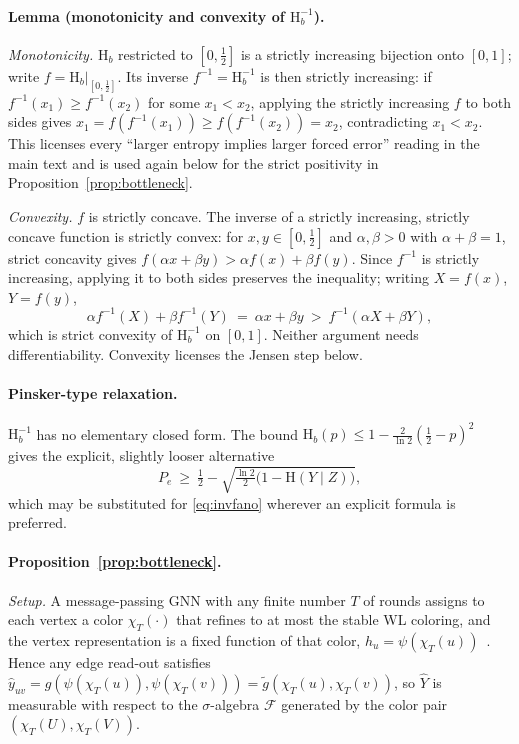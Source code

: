 \documentclass[sigconf, review, anonymous]{acmart}
\newcommand{\Hh}{\mathrm{H}}
\theoremstyle{plain}
\theoremstyle{definition}
\begin{document}
\paragraph{Lemma (monotonicity and convexity of $\Hh_b^{-1}$).}
\emph{Monotonicity.} $\Hh_b$ restricted to $[0,\tfrac12]$ is a strictly increasing bijection onto $[0,1]$; write $f=\Hh_b|_{[0,\tfrac12]}$. Its inverse $f^{-1}=\Hh_b^{-1}$ is then strictly increasing: if $f^{-1}(x_1)\ge f^{-1}(x_2)$ for some $x_1<x_2$, applying the strictly increasing $f$ to both sides gives $x_1=f(f^{-1}(x_1))\ge f(f^{-1}(x_2))=x_2$, contradicting $x_1<x_2$. This licenses every ``larger entropy implies larger forced error'' reading in the main text and is used again below for the strict positivity in Proposition~\ref{prop:bottleneck}.

\emph{Convexity.} $f$ is strictly concave. The inverse of a strictly increasing, strictly concave function is strictly convex: for $x,y\in[0,\tfrac12]$ and $\alpha,\beta>0$ with $\alpha+\beta=1$, strict concavity gives $f(\alpha x+\beta y) > \alpha f(x)+\beta f(y)$. Since $f^{-1}$ is strictly increasing, applying it to both sides preserves the inequality; writing $X=f(x)$, $Y=f(y)$,
\[
\alpha f^{-1}(X)+\beta f^{-1}(Y) \ =\ \alpha x+\beta y \ >\ f^{-1}(\alpha X+\beta Y),
\]
which is strict convexity of $\Hh_b^{-1}$ on $[0,1]$. Neither argument needs differentiability. Convexity licenses the Jensen step below.

\paragraph{Pinsker-type relaxation.} $\Hh_b^{-1}$ has no elementary closed form. The bound $\Hh_b(p)\le 1-\tfrac{2}{\ln 2}(\tfrac12-p)^2$~\citep{yeung2008information} gives the explicit, slightly looser alternative
\begin{equation}
P_e\ \ge\ \tfrac12-\sqrt{\tfrac{\ln 2}{2}\big(1-\Hh(Y\mid Z)\big)},
\label{eq:pinsker}
\end{equation}
which may be substituted for \eqref{eq:invfano} wherever an explicit formula is preferred.

\paragraph{Proposition~\ref{prop:bottleneck}.}
\emph{Setup.} A message-passing GNN with any finite number $T$ of rounds assigns to each vertex a color $\chi_T(\cdot)$ that refines to at most the stable WL coloring, and the vertex representation is a fixed function of that color, $h_u=\psi(\chi_T(u))$~\citep{xu2019powerful,morris2019weisfeiler}. Hence any edge read-out satisfies $\hat y_{uv}=g(\psi(\chi_T(u)),\psi(\chi_T(v)))=\tilde g(\chi_T(u),\chi_T(v))$, so $\hat Y$ is measurable with respect to the $\sigma$-algebra $\mathcal{F}$ generated by the color pair $(\chi_T(U),\chi_T(V))$.
\end{document}
